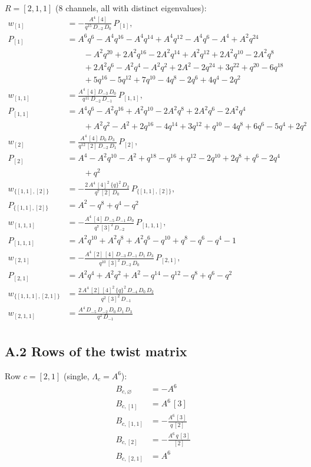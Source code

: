 \documentclass[11pt]{article}
\begin{document}
\noindent $R = [2,1,1]$ ($8$ channels, all with distinct eigenvalues):
\begin{align*}
w_{[1]} &= -\frac{A^{4}\,[4]}{q^{15}\,D_{-2}\,D_{0}}\,P_{[1]}, \\
 P_{[1]} &= A^{6}q^{6}-A^{4}q^{16}-A^{4}q^{14}+A^{4}q^{12}-A^{4}q^{6}-A^{4}+A^{2}q^{24} \\
 &\qquad -A^{2}q^{20}+2A^{2}q^{16}-2A^{2}q^{14}+A^{2}q^{12}+2A^{2}q^{10}-2A^{2}q^{8} \\
 &\qquad +2A^{2}q^{6}-A^{2}q^{4}-A^{2}q^{2}+2A^{2}-2q^{24}+3q^{22}+q^{20}-6q^{18} \\
 &\qquad +5q^{16}-5q^{12}+7q^{10}-4q^{8}-2q^{6}+4q^{4}-2q^{2} \\
w_{[1,1]} &= \frac{A^{4}\,[4]\,D_{-3}\,D_{0}}{q^{11}\,D_{-2}\,D_{-1}}\,P_{[1,1]}, \\
 P_{[1,1]} &= A^{4}q^{6}-A^{2}q^{16}+A^{2}q^{10}-2A^{2}q^{8}+2A^{2}q^{6}-2A^{2}q^{4} \\
 &\qquad +A^{2}q^{2}-A^{2}+2q^{16}-4q^{14}+3q^{12}+q^{10}-4q^{8}+6q^{6}-5q^{4}+2q^{2} \\
w_{[2]} &= \frac{A^{4}\,[4]\,D_{0}\,D_{3}}{q^{12}\,[2]\,D_{-2}\,D_{1}}\,P_{[2]}, \\
 P_{[2]} &= A^{4}-A^{2}q^{10}-A^{2}+q^{18}-q^{16}+q^{12}-2q^{10}+2q^{8}+q^{6}-2q^{4} \\
 &\qquad +q^{2} \\
w_{\{[1,1],[2]\}} &= -\frac{2\,A^{4}\,[4]^{2}\,\{q\}^{2}\,D_{2}}{q^{7}\,[2]\,D_{0}}\,P_{\{[1,1],[2]\}}, \\
 P_{\{[1,1],[2]\}} &= A^{2}-q^{8}+q^{4}-q^{2} \\
w_{[1,1,1]} &= -\frac{A^{4}\,[4]\,D_{-5}\,D_{-1}\,D_{0}}{q^{7}\,[3]^{2}\,D_{-2}}\,P_{[1,1,1]}, \\
 P_{[1,1,1]} &= A^{2}q^{10}+A^{2}q^{8}+A^{2}q^{6}-q^{10}+q^{8}-q^{6}-q^{4}-1 \\
w_{[2,1]} &= -\frac{A^{4}\,[2]\,[4]\,D_{-3}\,D_{-1}\,D_{1}\,D_{3}}{q^{10}\,[3]^{2}\,D_{-2}\,D_{0}}\,P_{[2,1]}, \\
 P_{[2,1]} &= A^{2}q^{4}+A^{2}q^{2}+A^{2}-q^{14}-q^{12}-q^{8}+q^{6}-q^{2} \\
w_{\{[1,1,1],[2,1]\}} &= \frac{2\,A^{4}\,[2]\,[4]^{2}\,\{q\}^{2}\,D_{-4}\,D_{0}\,D_{2}}{q^{2}\,[3]^{2}\,D_{-1}} \\
w_{[2,1,1]} &= \frac{A^{4}\,D_{-5}\,D_{-2}\,D_{0}\,D_{1}\,D_{3}}{q^{2}\,D_{-1}} \\
\end{align*}

\subsection*{A.2 Rows of the twist matrix}
\noindent Row $c = [2,1]$ (single, $\Lambda_c = A^{6}$):
\begin{align*}
B_{c,\varnothing} &= -A^{6} \\
B_{c,[1]} &= A^{6}\,[3] \\
B_{c,[1,1]} &= -\frac{A^{6}\,[3]}{q\,[2]} \\
B_{c,[2]} &= -\frac{A^{6}\,q\,[3]}{[2]} \\
B_{c,[2,1]} &= A^{6} \\
\end{align*}
\end{document}
